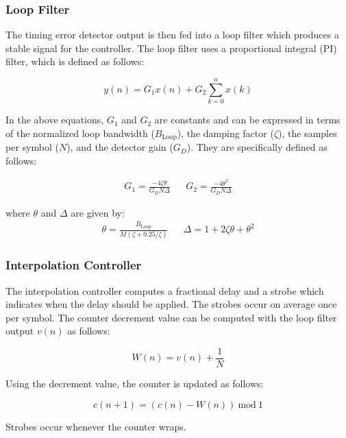 \documentclass[conference,onecolumn]{IEEEtran}
\begin{document}
\subsubsection{Loop Filter}

\noindent The timing error detector output is then fed into a loop filter which produces a stable signal for the controller. The loop filter uses a proportional integral (PI) filter, which is defined as follows:

\begin{equation}
	y(n) = G_1x(n) + G_2\sum_{k=0}^{n}{x(k)}
\end{equation}

\noindent In the above equations, $G_1$ and $G_2$ are constants and can be expressed in terms of the normalized loop bandwidth ($B_{\text{Loop}}$), the damping factor ($\zeta$), the samples per symbol ($N$), and the detector gain ($G_D$). They are specifically defined as follows:

\begin{align}
	G_1 = \frac{-4\zeta\theta}{G_DN\Delta} && G_2 = \frac{-4\theta^2}{G_DN\Delta}
	\label{eq::loop_filter}
\end{align}

\noindent where $\theta$ and $\Delta$ are given by:
\begin{align}
	\theta = \frac{B_{\text{Loop}}}{M(\zeta + 0.25/\zeta)} && \Delta = 1 + 2\zeta\theta + \theta^2
\end{align}

\subsubsection{Interpolation Controller}

The interpolation controller computes a fractional delay and a strobe which indicates when the delay should be applied. The strobes occur on average once per symbol. The counter decrement value can be computed with the loop filter output $v(n)$ as follows:

\begin{equation}
	W(n) = v(n) + \frac{1}{N}
\end{equation}

\noindent Using the decrement value, the counter is updated as follows:

\begin{equation}
	c(n + 1) = (c(n) - W(n))\ \text{mod}\ 1
\end{equation}

\noindent Strobes occur whenever the counter wraps.
\end{document}
